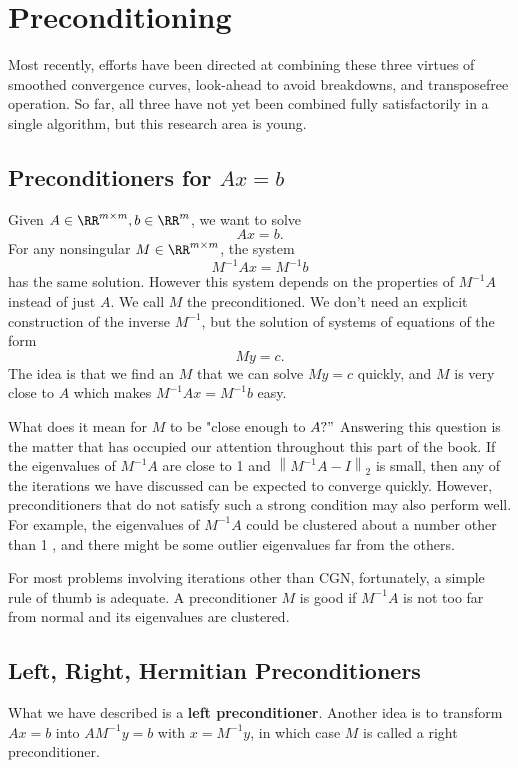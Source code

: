 \chapter{Preconditioning}

Most recently, efforts have been directed at combining these three virtues of smoothed convergence curves, look-ahead to avoid breakdowns, and transposefree operation. So far, all three have not yet been combined fully satisfactorily in a single algorithm, but this research area is young.

\section{Preconditioners for $ Ax=b $} 
Given $ A\in \RR^{m\times m}, b\in \RR^{m} $, we want to solve 
\[
    Ax =b.
\]
For any nonsingular $ M\in \RR^{m\times m} $, the system 
\[
    M^{-1}  A x = M^{-1}  b
\]
has the same solution. However this system depends on the properties of $ M^{-1} A $ instead of just $ A $.  We call $ M $ the preconditioned. We don't need an explicit construction of the inverse $ M^{-1}  $, but the solution of systems of equations of the form 
\[
    My = c.
\]
The idea is that we find an $ M $ that we can solve $ My=c $ quickly, and $ M $ is very close to $ A $ which makes $ M^{-1} Ax = M^{-1} b$ easy. 

What does it mean for $M$ to be "close enough to $A ? "$ Answering this question is the matter that has occupied our attention throughout this part of the book. If the eigenvalues of $M^{-1} A$ are close to 1 and $\left\|M^{-1} A-I\right\|_2$ is small, then any of the iterations we have discussed can be expected to converge quickly. However, preconditioners that do not satisfy such a strong condition may also perform well. For example, the eigenvalues of $M^{-1} A$ could be clustered about a number other than 1 , and there might be some outlier eigenvalues far from the others.

For most problems involving iterations other than CGN, fortunately, a simple rule of thumb is adequate. A preconditioner $M$ is good if $M^{-1} A$ is not too far from normal and its eigenvalues are clustered.

\section{Left, Right, Hermitian Preconditioners} 
What we have described is a \textbf{left preconditioner}. Another idea is to transform $ Ax=b $ into $ AM^{-1} y=b $ with $ x=M^{-1} y $, in which case $ M $ is called a right preconditioner. 

